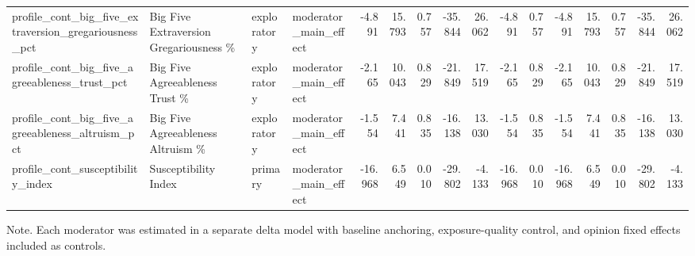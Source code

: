 \begin{table}[htbp]
{{\begin{tabular}{llllrrrrrrrrrrrr}
profile\_cont\_big\_five\_extraversion\_gregariousness\_pct & Big Five Extraversion Gregariousness \% & exploratory & moderator\_main\_effect & -4.891 & 15.793 & 0.757 & -35.844 & 26.062 & -4.891 & 0.757 & -4.891 & 15.793 & 0.757 & -35.844 & 26.062 \\
profile\_cont\_big\_five\_agreeableness\_trust\_pct & Big Five Agreeableness Trust \% & exploratory & moderator\_main\_effect & -2.165 & 10.043 & 0.829 & -21.849 & 17.519 & -2.165 & 0.829 & -2.165 & 10.043 & 0.829 & -21.849 & 17.519 \\
profile\_cont\_big\_five\_agreeableness\_altruism\_pct & Big Five Agreeableness Altruism \% & exploratory & moderator\_main\_effect & -1.554 & 7.441 & 0.835 & -16.138 & 13.030 & -1.554 & 0.835 & -1.554 & 7.441 & 0.835 & -16.138 & 13.030 \\
profile\_cont\_susceptibility\_index & Susceptibility Index & primary & moderator\_main\_effect & -16.968 & 6.549 & 0.010 & -29.802 & -4.133 & -16.968 & 0.010 & -16.968 & 6.549 & 0.010 & -29.802 & -4.133 \\
\bottomrule
\end{tabular}
}
}
\par\smallskip
{\normalsize Note. Each moderator was estimated in a separate delta model with baseline anchoring, exposure-quality control, and opinion fixed effects included as controls.}
\end{table}
